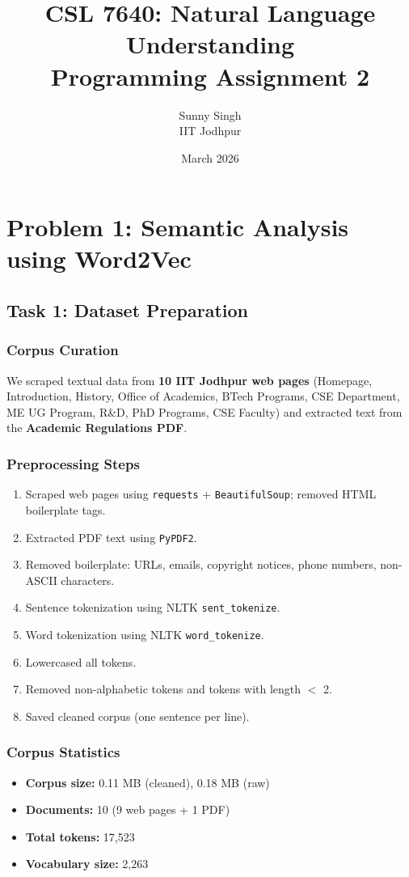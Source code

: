 \documentclass[11pt,a4paper]{article}
\title{\textbf{CSL 7640: Natural Language Understanding}\\Programming Assignment 2}
\author{Sunny Singh\\IIT Jodhpur}
\date{March 2026}
\begin{document}
\maketitle

\section{Problem 1: Semantic Analysis using Word2Vec}

\subsection{Task 1: Dataset Preparation}

\subsubsection{Corpus Curation}
We scraped textual data from \textbf{10 IIT Jodhpur web pages} (Homepage, Introduction, History, Office of Academics, BTech Programs, CSE Department, ME UG Program, R\&D, PhD Programs, CSE Faculty) and extracted text from the \textbf{Academic Regulations PDF}.

\subsubsection{Preprocessing Steps}
\begin{enumerate}[noitemsep]
    \item Scraped web pages using \texttt{requests} + \texttt{BeautifulSoup}; removed HTML boilerplate tags.
    \item Extracted PDF text using \texttt{PyPDF2}.
    \item Removed boilerplate: URLs, emails, copyright notices, phone numbers, non-ASCII characters.
    \item Sentence tokenization using NLTK \texttt{sent\_tokenize}.
    \item Word tokenization using NLTK \texttt{word\_tokenize}.
    \item Lowercased all tokens.
    \item Removed non-alphabetic tokens and tokens with length $<$ 2.
    \item Saved cleaned corpus (one sentence per line).
\end{enumerate}

\subsubsection{Corpus Statistics}
\begin{itemize}[noitemsep]
    \item \textbf{Corpus size:} 0.11 MB (cleaned), 0.18 MB (raw)
    \item \textbf{Documents:} 10 (9 web pages + 1 PDF)
    \item \textbf{Total tokens:} 17,523
    \item \textbf{Vocabulary size:} 2,263
\end{itemize}
\end{document}
